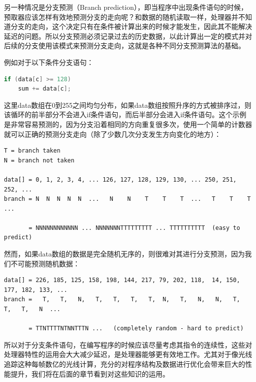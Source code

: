 另一种情况是分支预测（Branch prediction），即当程序中出现条件语句的时候，预取器应该怎样有效地预测分支的走向呢？和数据的随机读取一样，处理器并不知道分支的走向，这个决定只有在条件被计算出来的时候才能发生，因此其不能解决延迟的问题。所以分支预测必须记录过去的历史数据，以此计算出一定的模式并对后续的分支使用该模式来预测分支走向，这就是各种不同分支预测算法的基础。

例如对于以下条件分支语句：

\begin{lstlisting}[language=C++,mathescape]
if (data[c] >= 128)
	sum += data[c];
\end{lstlisting}

这里data数组在0到255之间均匀分布，如果data数组按照升序的方式被排序过，则该循环的前半部分不会进入if条件语句，而后半部分会进入if条件语句。这个示例是非常容易预测的，因为分支沿着相同的方向重复很多次，使用一个简单的计数器就可以正确的预测分支走向（除了少数几次分支发生方向变化的地方）：

\begin{fullwidth}
\begin{lstlisting}
T = branch taken
N = branch not taken

data[] = 0, 1, 2, 3, 4, ... 126, 127, 128, 129, 130, ... 250, 251, 252, ...
branch = N  N  N  N  N  ...   N    N    T    T    T  ...   T    T    T  ...

       = NNNNNNNNNNNN ... NNNNNNNTTTTTTTTT ... TTTTTTTTTT  (easy to predict)
\end{lstlisting}
\end{fullwidth}

然而，如果data数组的数据是完全随机无序的，则很难对其进行分支预测，因为我们不可能预测随机数据：

\begin{fullwidth}
\begin{lstlisting}
data[] = 226, 185, 125, 158, 198, 144, 217, 79, 202, 118,  14, 150, 177, 182, 133, ...
branch =   T,   T,   N,   T,   T,   T,   T,  N,   T,   N,   N,   T,   T,   T,   N  ...

       = TTNTTTTNTNNTTTN ...   (completely random - hard to predict)
\end{lstlisting}
\end{fullwidth}

所以对于分支条件语句，在编写程序的时候应该尽量考虑其指令的连续性，这些对处理器特性的运用会大大减少延迟，是处理器能够更有效地工作。尤其对于像光线追踪这种每帧数亿的光线计算，充分的对程序结构及数据进行优化会带来巨大的性能提升，我们将在后面的章节看到对这些知识的运用。





